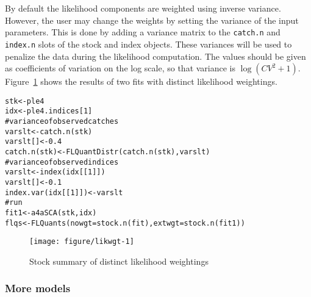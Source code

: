 \documentclass[a4paper,english,10pt]{article}\usepackage[]{graphicx}\usepackage[]{color}
\makeatletter
\def\maxwidth{ %
  \ifdim\Gin@nat@width>\linewidth
    \linewidth
  \else
    \Gin@nat@width
  \fi
}
\newcommand{\hlnum}[1]{\textcolor[rgb]{0.2,0.2,0.2}{#1}}%
\newcommand{\hlcom}[1]{\textcolor[rgb]{0.2,0.267,0.4}{#1}}%
\newcommand{\hlstd}[1]{\textcolor[rgb]{0,0,0}{#1}}%
\newcommand{\hlkwb}[1]{\textcolor[rgb]{0.361,0.506,0.596}{#1}}%
\newcommand{\hlkwc}[1]{\textcolor[rgb]{0.361,0.506,0.596}{#1}}%
\newcommand{\hlkwd}[1]{\textcolor[rgb]{0.361,0.506,0.596}{#1}}%
\newenvironment{kframe}{%
 \def\at@end@of@kframe{}%
 \ifinner\ifhmode%
  \def\at@end@of@kframe{\end{minipage}}%
  \begin{minipage}{\columnwidth}%
 \fi\fi%
 \def\FrameCommand##1{\hskip\@totalleftmargin \hskip-\fboxsep
 \colorbox{shadecolor}{##1}\hskip-\fboxsep
     \hskip-\linewidth \hskip-\@totalleftmargin \hskip\columnwidth}%
 \MakeFramed {\advance\hsize-\width
   \@totalleftmargin\z@ \linewidth\hsize
   \@setminipage}}%
 {\par\unskip\endMakeFramed%
 \at@end@of@kframe}
\newenvironment{knitrout}{}{} %
\newcommand{\code}[1]{{\texttt{#1}}}
\makeatother
\begin{document}
By default the likelihood components are weighted using inverse variance. However, the user may change the weights by setting the variance of the input parameters. This is done by adding a variance matrix to the \code{catch.n} and \code{index.n} slots of the stock and index objects. These variances will be used to penalize the data during the likelihood computation. The values should be given as coefficients of variation on the log scale, so that variance is $\log{({CV}^2 + 1)}$. Figure~\ref{fig:likwgt} shows the results of two fits with distinct likelihood weightings.

\begin{knitrout}
\color{fgcolor}\begin{kframe}
\begin{alltt}
\hlstd{stk} \hlkwb{<-} \hlstd{ple4}
\hlstd{idx} \hlkwb{<-} \hlstd{ple4.indices[}\hlnum{1}\hlstd{]}
\hlcom{# variance of observed catches}
\hlstd{varslt} \hlkwb{<-} \hlkwd{catch.n}\hlstd{(stk)}
\hlstd{varslt[]} \hlkwb{<-} \hlnum{0.4}
\hlkwd{catch.n}\hlstd{(stk)} \hlkwb{<-} \hlkwd{FLQuantDistr}\hlstd{(}\hlkwd{catch.n}\hlstd{(stk), varslt)}
\hlcom{# variance of observed indices}
\hlstd{varslt} \hlkwb{<-} \hlkwd{index}\hlstd{(idx[[}\hlnum{1}\hlstd{]])}
\hlstd{varslt[]} \hlkwb{<-} \hlnum{0.1}
\hlkwd{index.var}\hlstd{(idx[[}\hlnum{1}\hlstd{]])} \hlkwb{<-} \hlstd{varslt}
\hlcom{# run}
\hlstd{fit1} \hlkwb{<-} \hlkwd{a4aSCA}\hlstd{(stk, idx)}
\hlstd{flqs} \hlkwb{<-} \hlkwd{FLQuants}\hlstd{(}\hlkwc{nowgt}\hlstd{=}\hlkwd{stock.n}\hlstd{(fit),} \hlkwc{extwgt}\hlstd{=}\hlkwd{stock.n}\hlstd{(fit1))}
\end{alltt}
\end{kframe}
\end{knitrout}

\begin{knitrout}
\color{fgcolor}\begin{figure}[H]

{\centering \texttt{[image: figure/likwgt-1]} 

}

\caption[Stock summary of distinct likelihood weightings]{Stock summary of distinct likelihood weightings\label{fig:likwgt}}
\end{figure}


\end{knitrout}

\subsubsection{More models}
\end{document}
